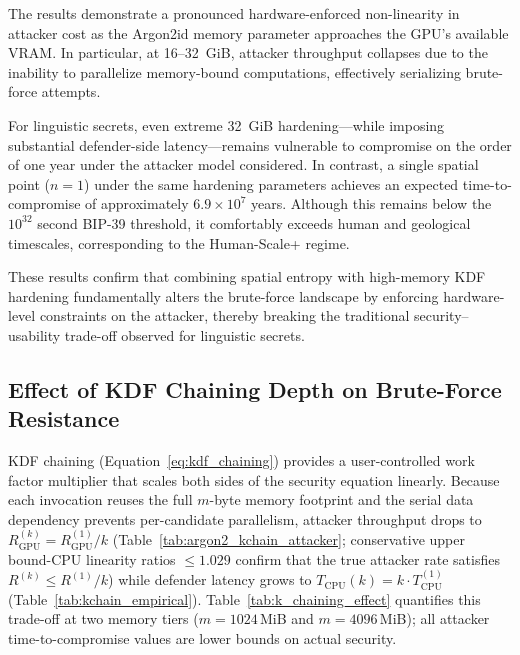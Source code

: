 \documentclass[mathematics,article,accept,pdftex,moreauthors]{Definitions/mdpi}
\begin{document}
The results demonstrate a pronounced hardware-enforced non-linearity in attacker cost as the Argon2id memory parameter approaches the GPU’s available VRAM. In particular, at 16–32~GiB, attacker throughput collapses due to the inability to parallelize memory-bound computations, effectively serializing brute-force attempts.

For linguistic secrets, even extreme 32~GiB hardening—while imposing substantial defender-side latency—remains vulnerable to compromise on the order of one year under the attacker model considered. In contrast, a single spatial point ($n=1$) under the same hardening parameters achieves an expected time-to-compromise of approximately $6.9 \times 10^{7}$ years. Although this remains below the $10^{32}$ second BIP-39 threshold, it comfortably exceeds human and geological timescales, corresponding to the Human-Scale+ regime.


\clearpage
These results confirm that combining spatial entropy with high-memory KDF hardening fundamentally alters the brute-force landscape by enforcing hardware-level constraints on the attacker, thereby breaking the traditional security–usability trade-off observed for linguistic secrets.

\subsection{Effect of KDF Chaining Depth on Brute-Force Resistance}
\label{sec:kchain_analysis}
\label{sec:kchain_spectrum}

{KDF chaining (Equation~\eqref{eq:kdf_chaining}) provides a user-controlled work factor multiplier that scales both sides of the security equation linearly. Because each invocation reuses the full $m$-byte memory footprint and the serial data dependency prevents per-candidate parallelism, attacker throughput drops to $R_\text{GPU}^{(k)} = R_\text{GPU}^{(1)} / k$ (Table~\ref{tab:argon2_kchain_attacker}; conservative upper bound-CPU linearity ratios $\leq 1.029$ confirm that the true attacker rate satisfies $R^{(k)} \leq R^{(1)}/k$) while defender latency grows to $T_\text{CPU}(k) = k \cdot T_\text{CPU}^{(1)}$ (Table~\ref{tab:kchain_empirical}). Table~\ref{tab:k_chaining_effect} quantifies this trade-off at two memory tiers ($m=1024$\,MiB and $m=4096$\,MiB); all attacker time-to-compromise values are lower bounds on actual security.}
\end{document}
